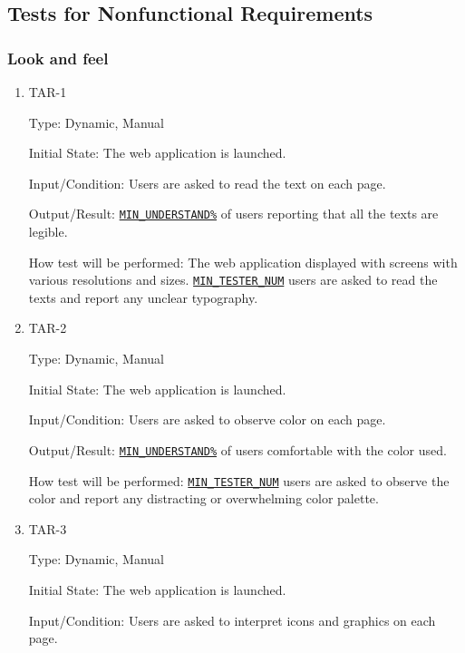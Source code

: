 \documentclass[12pt, titlepage]{article}
\begin{document}
\begin{enumerate}
\subsection{Tests for Nonfunctional Requirements}

\subsubsection{Look and feel}
		

\begin{enumerate}

\item{TAR-1\\}\label{TAR-1}

Type: Dynamic, Manual
					
Initial State: The web application is launched.
					
Input/Condition: Users are asked to read the text on each page.
					
Output/Result:  \hyperref[MIN_UNDERSTAND]{\texttt{MIN\_UNDERSTAND\%}} of users reporting that all the texts are legible.
					
How test will be performed: The web application displayed with screens with various resolutions and sizes. \hyperref[MIN_TESTER_NUM]{\texttt{MIN\_TESTER\_NUM}} users are asked to read the texts and report any unclear typography.
					
\item{TAR-2\\}\label{TAR-2}

Type: Dynamic, Manual
					
Initial State: The web application is launched.
					
Input/Condition: Users are asked to observe color on each page.
					
Output/Result: \hyperref[MIN_UNDERSTAND]{\texttt{MIN\_UNDERSTAND\%}} of users comfortable with the color used.
					
How test will be performed: \hyperref[MIN_TESTER_NUM]{\texttt{MIN\_TESTER\_NUM}} users are asked to observe the color and report any distracting or overwhelming color palette.

\item{TAR-3\\}\label{TAR-3}

Type: Dynamic, Manual
					
Initial State: The web application is launched.
					
Input/Condition: Users are asked to interpret icons and graphics on each page.
					

\end{enumerate}
\end{enumerate}
\end{document}
